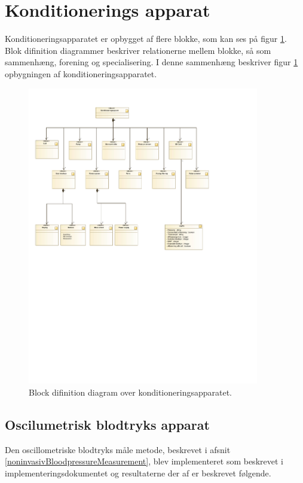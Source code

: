 \section{Konditionerings apparat}
Konditioneringsapparatet er opbygget af flere blokke, som kan ses på figur \ref{fig:BDD(SystemOverview)}. Blok difinition diagrammer beskriver relationerne mellem blokke, så som sammenhæng, forening og specialisering. I denne sammenhæng beskriver figur \ref{fig:BDD(SystemOverview)} opbygningen af konditioneringsapparatet. 
\begin{figure}[H]
	\centering
	\includegraphics[width=0.9\textwidth]{billeder/BDD(SystemOverview).pdf}
	\caption{Block difinition diagram over konditioneringsapparatet.}\label{fig:BDD(SystemOverview)}
\end{figure}

\subsection{Oscilumetrisk blodtryks apparat}
Den oscillometriske blodtryks måle metode, beskrevet i afsnit \ref{noninvasivBloodpressureMeasurement}, blev implementeret som beskrevet i implementeringsdokumentet og resultaterne der af er beskrevet følgende.

